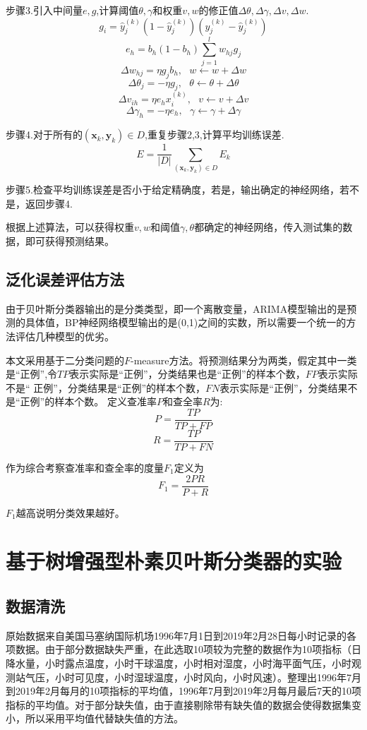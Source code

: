 \documentclass{ctexart}
\begin{document}
步骤3.引入中间量$e,g$,计算阈值$\theta,\gamma$和权重$v,w$的修正值$\Delta\theta,\Delta\gamma,\Delta v,\Delta w$.
$$g_{i}=\hat{y}_{j}^{(k)}(1-\hat{y}_{j}^{(k)})(y_{j}^{(k)}-\hat{y}_{j}^{(k)})$$
$$e_{h}=b_{h}(1-b_{h})\sum_{j=1}^{l}w_{hj}g_{j}$$
$$\Delta w_{hj}=\eta g_{j}b_{h}, \ \ \ w\leftarrow w+\Delta w$$
$$\Delta\theta_{j}=-\eta g_{j},\ \ \ \theta\leftarrow \theta +\Delta \theta$$
$$\Delta v_{ih}=\eta e_{h}x^{(k)}_{i},\ \ \ v\leftarrow v+\Delta v$$
$$\Delta \gamma_{h}=-\eta e_{h},\ \ \ \gamma\leftarrow\gamma+\Delta\gamma$$

步骤4.对于所有的$(\bm{x}_{k},\bm{y}_{k})\in D$,重复步骤2,3,计算平均训练误差.
$$E=\frac{1}{|D|}\sum_{(\bm{x}_{k},\bm{y}_{k})\in D}E_{k}$$

步骤5.检查平均训练误差是否小于给定精确度，若是，输出确定的神经网络，若不是，返回步骤4.

根据上述算法，可以获得权重$v,w$和阈值$\gamma,\theta$都确定的神经网络，传入测试集的数据，即可获得预测结果。

\subsection{泛化误差评估方法}

由于贝叶斯分类器输出的是分类类型，即一个离散变量，ARIMA模型输出的是预测的具体值，BP神经网络模型输出的是(0,1)之间的实数，所以需要一个统一的方法评估几种模型的优劣。

本文采用基于二分类问题的$F$-measure方法。将预测结果分为两类，假定其中一类是``正例'',令$TP$表示实际是``正例''，分类结果也是``正例''的样本个数，$FP$表示实际不是`` 正例''，分类结果是``正例''的样本个数，$FN$表示实际是``正例''，分类结果不是``正例''的样本个数。
定义查准率$P$和查全率$R$为:
$$P=\frac{TP}{TP+FP}$$
$$R=\frac{TP}{TP+FN}$$

作为综合考察查准率和查全率的度量$F_{1}$定义为
$$F_{1}=\frac{2PR}{P+R}$$

$F_{1}$越高说明分类效果越好。


\newpage
\section{基于树增强型朴素贝叶斯分类器的实验}
\subsection{数据清洗}
   原始数据来自美国马塞纳国际机场1996年7月1日到2019年2月28日每小时记录的各项数据。由于部分数据缺失严重，在此选取10项较为完整的数据作为10项指标（日降水量，小时露点温度，小时干球温度，小时相对湿度，小时海平面气压，小时观测站气压，小时可见度，小时湿球温度，小时风向，小时风速）。整理出1996年7月到2019年2月每月的10项指标的平均值，1996年7月到2019年2月每月最后7天的10项指标的平均值。对于部分缺失值，由于直接剔除带有缺失值的数据会使得数据集变小，所以采用平均值代替缺失值的方法。
\end{document}
